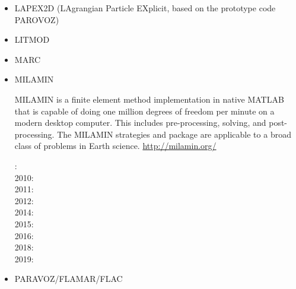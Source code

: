 \begin{itemize}
\item LAPEX2D (LAgrangian Particle EXplicit, based on the prototype code PAROVOZ) 
\cite{sopg05}
\cite{bbeg06}\cite{basv06}
\cite{baso08}
\cite{scbe08}
\cite{sosk11}


\item LITMOD
\cite{afrf07}
\cite{affr08}
\cite{fuac09}
\cite{fufa10}


\item MARC
\cite{nesg97}
\cite{nesb99}


\item MILAMIN

MILAMIN is a finite element method implementation in native MATLAB that is capable of doing one million degrees of freedom per minute on a modern desktop computer. This includes pre-processing, solving, and post-processing. The MILAMIN strategies and package are applicable to a broad class of problems in Earth science. \url{http://milamin.org/}

: \cite{daks08}\\
2010: \cite{krda10}\cite{kaus10}\\
2011: \cite{yakm11}\\
2012: \cite{gebk12}\\
2014: \cite{jobk14}\\
2015: \cite{lukz15}\cite{gehm15}\cite{thkp15}\cite{musd15}\\
2016: \cite{jads16}\cite{maka16}\\
2018: \cite{dusd18}\cite{jasc18}\cite{jadg18}\cite{comj18}\cite{jens18}\cite{rabw18}\cite{chsm18}\\
2019: \cite{anpa19}\cite{sifg19}\cite{baba19}


\item PARAVOZ/FLAMAR/FLAC


\end{itemize}
